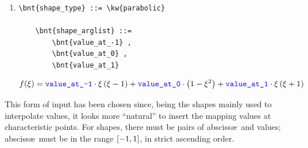 \begin{enumerate}
\begin{Verbatim}[commandchars=\\\{\}]
    \bnt{shape_arglist} ::=
        \bnt{number_of_points} , 
            \bnt{abscissa} , \bnt{value}
            [ , ... ]
\end{Verbatim}
\begin{subequations}
\begin{align}
	f(\xi) &= \nt{value}_1	&& \xi \le \nt{abscissa}_1
	\\
	f(\xi) &=
		\nt{value}_i \, \, \frac{\nt{abscissa}_{i+1} - \xi}{\nt{abscissa}_{i+1} - \nt{abscissa}_i}
	\nonumber \\
		&
		+ \nt{value}_{i+1} \, \frac{\xi - \nt{abscissa}_i}{\nt{abscissa}_{i+1} - \nt{abscissa}_i}
		&& \nt{abscissa}_i \le \xi < \nt{abscissa}_{i+1}
	\\
	f(\xi) &= \nt{value}_N	&& \nt{abscissa}_N \le \xi
\end{align}
\end{subequations}

    \item {}
\begin{Verbatim}[commandchars=\\\{\}]
    \bnt{shape_type} ::= \kw{parabolic}

    \bnt{shape_arglist} ::=
        \bnt{value_at_-1} , 
        \bnt{value_at_0} , 
        \bnt{value_at_1}
\end{Verbatim}
\begin{align}
	f(\xi) &= \textcolor{blue}{\texttt{value\_at\_-1}} \cdot \xi\left( \xi - 1 \right)
		+ \textcolor{blue}{\texttt{value\_at\_0}} \cdot \left( 1 - \xi^2 \right)
		+ \textcolor{blue}{\texttt{value\_at\_1}} \cdot \xi\left( \xi + 1 \right)
\end{align}

\end{enumerate}
This form of input has been chosen since, being the shapes mainly used to
interpolate values, it looks more ``natural'' to insert the mapping values
at characteristic points.
For  shapes, there must be 
 pairs of absciss\ae\ and values; absciss\ae\
must be in the range $\left[ -1,1 \right]$, in strict ascending order.


